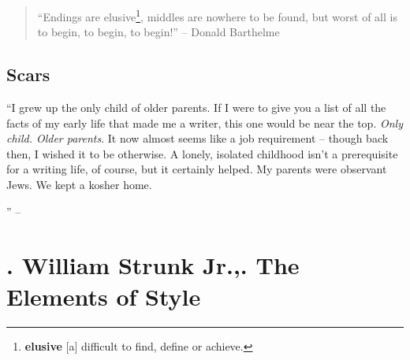 \documentclass[oneside]{book}
\numberwithin{equation}{section}
\begin{document}
\begin{quotation}
	``Endings are elusive\footnote{\textbf{elusive} [a] difficult to find, define or achieve.}, middles are nowhere to be found, but worst of all is to begin, to begin, to begin!'' -- Donald Barthelme
\end{quotation}

\section{Scars}
``I grew up the only child of older parents. If I were to give you a list of all the facts of my early life that made me a writer, this one would be near the top. \textit{Only child. Older parents}. It now almost seems like a job requirement -- though back then, I wished it to be otherwise. A lonely, isolated childhood isn't a prerequisite for a writing life, of course, but it certainly helped. My parents were observant Jews. We kept a kosher home.

'' -- \cite[pp. 14--]{Shapiro2014}


\chapter{\cite{Strunk1918, Strunk_White2019}. William Strunk Jr.,. The Elements of Style}
\end{document}
